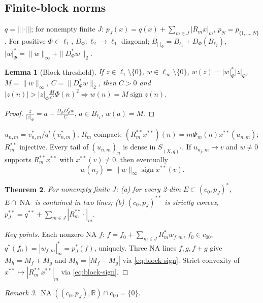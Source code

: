\documentclass[10pt]{amsart}
\newtheorem{theorem}{Theorem}[section]
\newtheorem{lemma}[theorem]{Lemma}
\theoremstyle{remark}
\newtheorem{remark}[theorem]{Remark}
\newcommand{\R}{\mathbb{R}}
\newcommand{\NA}{\operatorname{NA}}
\newcommand{\tn}[1]{|\!|\!|#1|\!|\!|}
\newcommand{\sgn}{\operatorname{sign}}
\begin{document}
\subsection{Finite-block norms}\label{subsec:finite-blocks}
$q=\tn{\cdot}$; for nonempty finite $J$: $p_J(x)=q(x)+\sum_{m\in J}|R_mx|_m$, $p_N=p_{\{1,\dots,N\}}$.
For positive $\Phi\in\ell_1$, $D_\Phi:\ell_2\to\ell_1$ diagonal; $B_{|\cdot|_\Phi}=B_{\ell_1}+D_\Phi(B_{\ell_2})$, $|w|_\Phi^*=\|w\|_\infty+\|D_\Phi^*w\|_2$.
\begin{lemma}[Block threshold]\label{lem:block-threshold}
If $z\in\ell_1\setminus\{0\}$, $w\in\ell_\infty\setminus\{0\}$, $w(z)=|w|_\Phi^*|z|_\Phi$, $M=\|w\|_\infty$, $C=\|D_\Phi^*w\|_2$, then $C>0$ and $|z(n)|>|z|_\Phi\frac{M}{C}\Phi(n)^2\Rightarrow w(n)=M\sgn z(n)$.
\end{lemma}
\begin{proof}
$\frac{z}{|z|_\Phi}=a+\frac{D_\Phi D_\Phi^*w}{C}$, $a\in B_{\ell_1}$, $w(a)=M$.
\end{proof}
$u_{n,m}=v^*_{n,m}/q^*(v^*_{n,m})$; $R_m$ compact; $(R_m^{**}x^{**})(n)=m\Phi_m(n)x^{**}(u_{n,m})$; $R_m^{**}$ injective. Every tail of $(u_{n,m})_n$ is dense in $S_{(X,q)^*}$. If $u_{n_j,m}\to v$ and $w\ne0$ supports $R_m^{**}x^{**}$ with $x^{**}(v)\ne0$, then eventually
\begin{equation}\label{eq:block-sign}
 w(n_j)=\|w\|_\infty\sgn x^{**}(v).
\end{equation}
\begin{theorem}\label{thm:finite-blocks}
For nonempty finite $J$: (a) for every 2-dim $E\subset(c_0,p_J)^*$, $E\cap\NA$ is contained in two lines; (b) $(c_0,p_J)^{**}$ is strictly convex, $p_J^{**}=q^{**}+\sum_{m\in J}|R_m^{**}\cdot|_m$.
\end{theorem}
\begin{proof}[Key points]
Each nonzero NA $f$: $f=f_0+\sum_{m\in J}R_m^*w_{f,m}$, $f_0\in c_{00}$, $q^*(f_0)=|w_{f,m}|_m^*=p_J^*(f)$, uniquely. Three NA lines $f,g,f+g$ give $M_h=M_f+M_g$ and $M_h=|M_f-M_g|$ via \eqref{eq:block-sign}. Strict convexity of $x^{**}\mapsto|R_m^{**}x^{**}|_m$ via \eqref{eq:block-sign}.
\end{proof}
\begin{remark}
$\NA((c_0,p_J),\R)\cap c_{00}=\{0\}$.
\end{remark}
\end{document}
